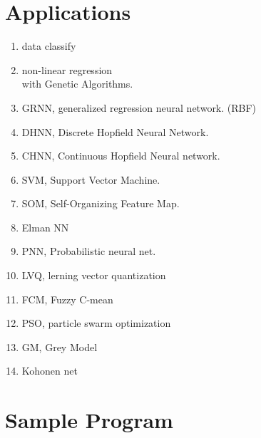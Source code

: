 \documentclass[a4paper,10pt]{article}
\begin{document}
\section{Applications}
	\begin{enumerate}
		\item data classify
		\item non-linear regression\\
			with Genetic Algorithms.
		\item GRNN, generalized regression neural network. (RBF)
		\item DHNN, Discrete Hopfield Neural Network.
		\item CHNN, Continuous Hopfield Neural network.
		\item SVM, Support Vector Machine.


		\item SOM, Self-Organizing Feature Map.

		\item Elman NN

		\item PNN, Probabilistic neural net.

		\item LVQ, lerning vector quantization



		\item FCM, Fuzzy C-mean

		\item PSO, particle swarm optimization

		\item GM, Grey Model

		\item Kohonen net
	\end{enumerate}

\appendix
\section{Sample Program}

\end{document}
